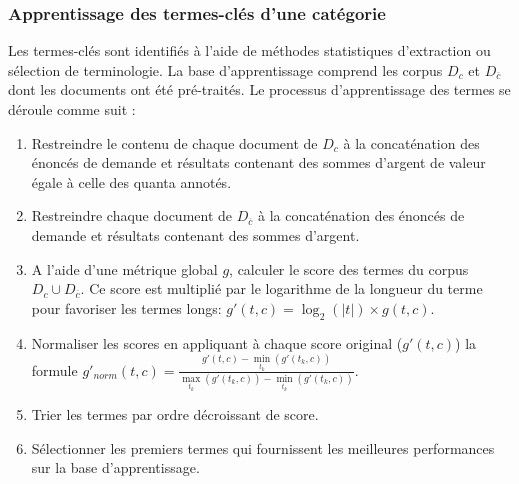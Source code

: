 \subsubsection{Apprentissage des termes-clés d'une catégorie}
Les termes-clés sont identifiés à l'aide de méthodes statistiques d'extraction ou sélection de terminologie. La base d'apprentissage comprend les corpus $D_c$ et $D_{\overline{c}}$ dont les documents ont été pré-traités. %
 Le processus d'apprentissage des termes se déroule comme suit :
 
 \begin{enumerate}
 	\item Restreindre le contenu de chaque document de $D_c$ à la concaténation des énoncés de demande et résultats contenant des sommes d'argent de valeur égale à celle des quanta annotés.
 	\item Restreindre chaque document de $D_{\overline{c}}$ à la concaténation des énoncés de demande et résultats contenant des sommes d'argent.
 	\item A l'aide d'une métrique global $g$, calculer le score des termes du corpus $D_c \cup D_{\overline{c}}$. Ce score est multiplié par le logarithme de la longueur du terme pour favoriser les termes longs: $g'(t,c) = \log_2(\vert t \vert) \times g(t, c)$.
 	\item Normaliser les scores en appliquant à chaque score original ($g'(t,c)$) la formule $g'_{norm}(t,c) = \frac{g'(t,c) - \min\limits_{t_k} (g'(t_k,c))}{\max\limits_{t_k} (g'(t_k,c)) - \min\limits_{t_k} (g'(t_k,c))}$. 
 	\item Trier les termes par ordre décroissant de score.
 	\item Sélectionner les premiers termes qui fournissent les meilleures performances sur la base d'apprentissage.
 \end{enumerate}


